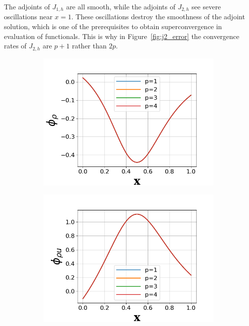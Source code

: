 \documentclass[a4paper]{article}
\begin{document}
The adjoints of $J_{1,h}$ are all smooth, while the adjoints of $J_{2,h}$ see severe oscillations near $x=1$. These oscillations destroy the smoothness of the adjoint solution, which is one of the prerequisites to obtain superconvergence in evaluation of functionals. This is why in Figure~\ref{fig:j2_error} the convergence rates of $J_{2,h}$ are $p+1$ rather than $2p$.
\begin{figure}[!htbp]
  \centering
  \begin{subfigure}{0.45\textwidth}
    \centering
    \includegraphics[width=1.0\linewidth]{figures/J1_phi_1.png}
    \label{fig:j1_phi1}
  \end{subfigure}
  \begin{subfigure}{0.45\textwidth}
    \centering
    \includegraphics[width=1.0\linewidth]{figures/J1_phi_2.png}

\end{subfigure}
\end{figure}
\end{document}
